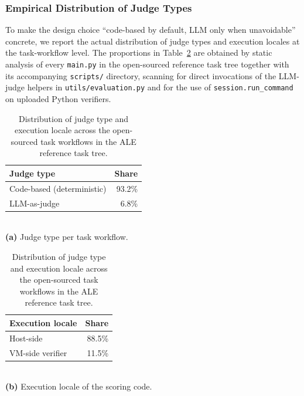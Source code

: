 \subsubsection{Empirical Distribution of Judge Types}
\label{app:eval-judge-stats}

To make the design choice ``code-based by default, LLM only when unavoidable'' concrete, we report the actual distribution of judge types and execution locales at the task-workflow level. The proportions in Table~\ref{tab:judge-stats} are obtained by static analysis of every \texttt{main.py} in the open-sourced reference task tree together with its accompanying \texttt{scripts/} directory, scanning for direct invocations of the LLM-judge helpers in \texttt{utils/evaluation.py} and for the use of \texttt{session.run\_command} on uploaded Python verifiers.

\begin{table}[htbp]
    \centering
    \footnotesize
    \begin{minipage}[t]{0.48\textwidth}
        \centering
        \begin{tabular}{l r}
            \toprule
            \textbf{Judge type} & \textbf{Share}\\
            \midrule
            Code-based (deterministic)   & 93.2\%\\
            LLM-as-judge                 &  6.8\%\\
            \bottomrule
        \end{tabular}
        \\[0.4em]
        \textbf{(a)} Judge type per task workflow.
    \end{minipage}\hfill
    \begin{minipage}[t]{0.48\textwidth}
        \centering
        \begin{tabular}{l r}
            \toprule
            \textbf{Execution locale} & \textbf{Share}\\
            \midrule
            Host-side                       & 88.5\%\\
            VM-side verifier                & 11.5\%\\
            \bottomrule
        \end{tabular}
        \\[0.4em]
        \textbf{(b)} Execution locale of the scoring code.
    \end{minipage}
    \caption{Distribution of judge type and execution locale across the open-sourced task workflows in the ALE reference task tree.}
    \label{tab:judge-stats}
\end{table}

